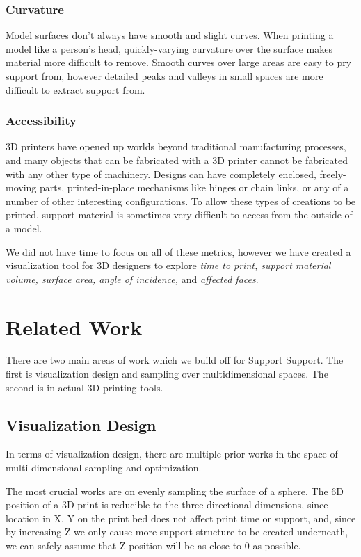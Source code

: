 \documentclass{sigchi}
\begin{document}
\subsubsection{Curvature}
Model surfaces don't always have smooth and slight curves.  When printing a model like a person's head, quickly-varying curvature over the surface makes material more difficult to remove.  Smooth curves over large areas are easy to pry support from, however detailed peaks and valleys in small spaces are more difficult to extract support from.

\subsubsection{Accessibility}
3D printers have opened up worlds beyond traditional manufacturing processes, and many objects that can be fabricated with a 3D printer cannot be fabricated with any other type of machinery.  Designs can have completely enclosed, freely-moving parts, printed-in-place mechanisms like hinges or chain links, or any of a number of other interesting configurations.  To allow these types of creations to be printed, support material is sometimes very difficult to access from the outside of a model.

We did not have time to focus on all of these metrics, however we have created a visualization tool for 3D designers to explore \emph{time to print, support material volume, surface area, angle of incidence,} and \emph{affected faces}.

\section{Related Work}
There are two main areas of work which we build off for Support Support.  The first is visualization design and sampling over multidimensional spaces.  The second is in actual 3D printing tools.

\subsection{Visualization Design}
In terms of visualization design, there are multiple prior works in the space of multi-dimensional sampling and optimization.

The most crucial works are on evenly sampling the surface of a sphere.  The 6D position of a 3D print is reducible to the three directional dimensions, since location in X, Y on the print bed does not affect print time or support, and, since by increasing Z we only cause more support structure to be created underneath, we can safely assume that Z position will be as close to 0 as possible.
\end{document}
